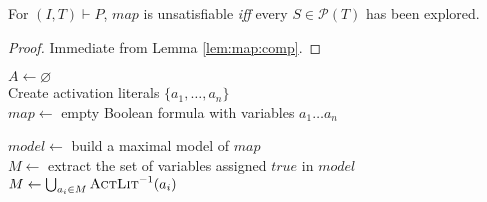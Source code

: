 \begin{lemma}
\label{lem:map:cc}
For $(I, T) \vdash P$, $map$ is unsatisfiable \emph{iff} every $S \in \mathcal{P}(T)$ has been explored.
\end{lemma}
\begin{proof}
Immediate from Lemma \ref{lem:map:comp}.
\end{proof}

\begin{algorithm}[t]
  $A \leftarrow \varnothing$\\
  Create activation literals $\{a_1, \ldots, a_n\}$ \\
  $map \leftarrow$ empty Boolean formula with variables $a_1 \ldots a_n$ \\ 
  \BlankLine
    
   {
    $model \leftarrow $ build a maximal model of $map$ \\
    $M \leftarrow$ extract the set of variables assigned $true$ in $model$ \\
    $M \leftarrow \bigcup_{a_i \in M} \textsc{ActLit} ^{-1}(a_i)$ \\
 
  }
\caption{$\aivcalg (T, P)$}
\label{alg:aivc}
\end{algorithm}
 
